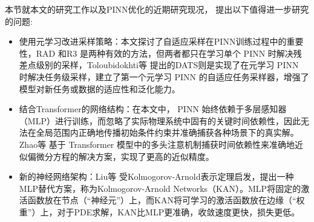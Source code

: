 本节就本文的研究工作以及PINN优化的近期研究现况， 提出以下值得进一步研究的问题:
\begin{itemize}
    \item 使用元学习改进采样策略：本文探讨了自适应采样在PINN训练过程中的重要性，RAD \cite{wu2023comprehensive}和R3 \cite{daw2022mitigating}是两种有效的方法，但两者都只在学习单个 PINN 时解决残差点级别的采样，Toloubidokhti等 \cite{toloubidokhti2024dats}提出的DATS则是实现了在元学习 PINN 时解决任务级采样，建立了第一个元学习 PINN 的自适应任务采样器，增强了模型对新任务或数据的适应性和泛化能力。
    \item 结合Transformer的网络结构：在本文中， PINN 始终依赖于多层感知器（MLP）进行训练，而忽略了实际物理系统中固有的关键时间依赖性，因此无法在全局范围内正确地传播初始条件约束并准确捕获各种场景下的真实解。Zhao等 \cite{zhao2023pinnsformer}基于 Transformer 模型中的多头注意机制捕获时间依赖性来准确地近似偏微分方程的解决方案，实现了更高的近似精度。
    \item 新的神经网络架构：Liu等 \cite{liu2024kan}受Kolmogorov-Arnold表示定理启发，提出一种MLP替代方案，称为Kolmogorov-Arnold Networks（KAN）。MLP将固定的激活函数放在节点（“神经元”）上，而KAN将可学习的激活函数放在边缘（“权重”）上，对于PDE求解，KAN比MLP更准确，收敛速度更快，损失更低。
\end{itemize}



